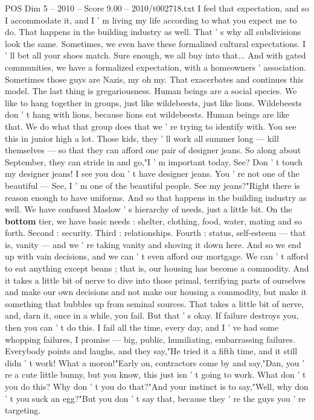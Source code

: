 \begin{textsample}{POS Dim 5 – 2010 – Score 9.00 – 2010/t002718.txt}
I feel that expectation, and so I accommodate it, and I ' m living my life according to what you expect me to do.
That happens in the building industry as well.
That ' s why all subdivisions look the same.
Sometimes, we even have these formalized cultural expectations.
I ' ll bet all your shoes match.
Sure enough, we all buy into that...
And with gated communities, we have a formalized expectation, with a homeowners ' association.
Sometimes those guys are Nazis, my oh my.
That exacerbates and continues this model.
The last thing is gregariousness.
Human beings are a social species.
We like to hang together in groups, just like wildebeests, just like lions.
Wildebeests don ' t hang with lions, because lions eat wildebeests.
Human beings are like that.
We do what that group does that we ' re trying to identify with.
You see this in junior high a lot.
Those kids, they ' ll work all summer long — kill themselves — so that they can afford one pair of designer jeans.
So along about September, they can stride in and go,"I ' m important today.
See?
Don ' t touch my designer jeans!
I see you don ' t have designer jeans.
You ' re not one of the beautiful — See, I ' m one of the beautiful people.
See my jeans?"Right there is reason enough to have uniforms.
And so that happens in the building industry as well.
We have confused Maslow ' s hierarchy of needs, just a little bit.
On the \textbf{bottom} tier, we have basic needs : shelter, clothing, food, water, mating and so forth.
Second : security.
Third : relationships.
Fourth : status, self-esteem — that is, vanity — and we ' re taking vanity and shoving it down here.
And so we end up with vain decisions, and we can ' t even afford our mortgage.
We can ' t afford to eat anything except beans ; that is, our housing has become a commodity.
And it takes a little bit of nerve to dive into those primal, terrifying parts of ourselves and make our own decisions and not make our housing a commodity, but make it something that bubbles up from seminal sources.
That takes a little bit of nerve, and, darn it, once in a while, you fail.
But that ' s okay.
If failure destroys you, then you can ' t do this.
I fail all the time, every day, and I ' ve had some whopping failures, I promise — big, public, humiliating, embarrassing failures.
Everybody points and laughs, and they say,"He tried it a fifth time, and it still didn ' t work!
What a moron!"Early on, contractors come by and say,"Dan, you ' re a cute little bunny, but you know, this just isn ' t going to work.
What don ' t you do this?
Why don ' t you do that?"And your instinct is to say,"Well, why don ' t you suck an egg?"But you don ' t say that, because they ' re the guys you ' re targeting.

\end{textsample}
